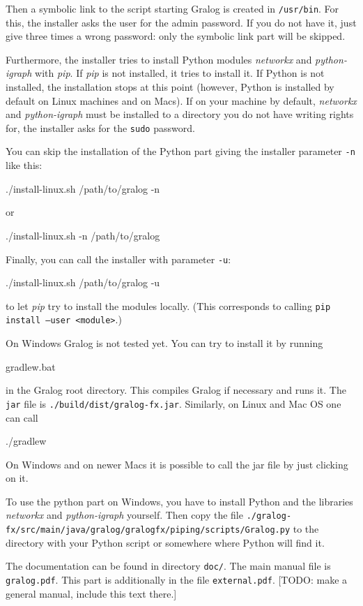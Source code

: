 \documentclass{article}
\begin{document}
Then a symbolic link to the script starting Gralog is created in
\texttt{/usr/bin}. For this, the installer asks the user for the admin
password. If you do not have it, just give three times a wrong
password: only the symbolic link part will be skipped.

Furthermore, the installer tries to install Python modules \emph{networkx} and
\emph{python-igraph} with \emph{pip}. If \emph{pip} is not installed,
it tries to install it. If Python is not installed, the installation
stops at this point (however, Python is installed by default on Linux
machines and on Macs). If on your machine by default, \emph{networkx}
and \emph{python-igraph} must be
installed to a directory you do not have writing rights for, the
installer asks for the \texttt{sudo} password.

You can skip the installation of the Python part giving the installer
parameter \texttt{-n} like this:

\begin{tcolorbox}
  ./install-linux.sh /path/to/gralog -n
\end{tcolorbox}
or
\begin{tcolorbox}
  ./install-linux.sh -n /path/to/gralog
\end{tcolorbox}

Finally, you can call the installer with parameter \texttt{-u}:

\begin{tcolorbox}
  ./install-linux.sh /path/to/gralog -u
\end{tcolorbox}
to let \emph{pip} try to install the modules locally. (This
corresponds to calling \texttt{pip install --user <module>}.)

On Windows Gralog is not tested yet. You can try to install it by
running

\begin{tcolorbox}
  gradlew.bat
\end{tcolorbox}
in the Gralog root directory. This compiles Gralog if necessary and
runs it. The \texttt{jar} file is
\texttt{./build/dist/gralog-fx.jar}. Similarly, on Linux and Mac OS
one can call
\begin{tcolorbox}
  ./gradlew
\end{tcolorbox}


On Windows and on newer Macs it is possible to call the jar file by
just clicking on it.

To use the python part on Windows, you have to install Python and the
libraries \emph{networkx} and \emph{python-igraph} yourself. Then copy
the file
\texttt{./gralog-fx/src/main/java/gralog/gralogfx/piping/scripts/Gralog.py}
to the directory with your Python script or somewhere where Python
will find it.


The documentation can be found in directory \texttt{doc/}. The main
manual file is \texttt{gralog.pdf}. This part is additionally in the
file \texttt{external.pdf}. [TODO: make a general manual, include this
text there.]




\end{document}
